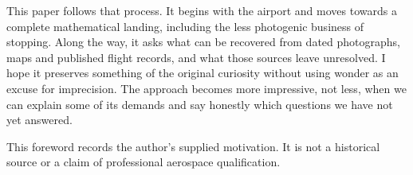 This paper follows that process. It begins with the airport and moves towards a complete mathematical landing, including the less photogenic business of stopping. Along the way, it asks what can be recovered from dated photographs, maps and published flight records, and what those sources leave unresolved. I hope it preserves something of the original curiosity without using wonder as an excuse for imprecision. The approach becomes more impressive, not less, when we can explain some of its demands and say honestly which questions we have not yet answered.

\vfill{\small This foreword records the author's supplied motivation. It is not a historical source or a claim of professional aerospace qualification.}
\clearpage
